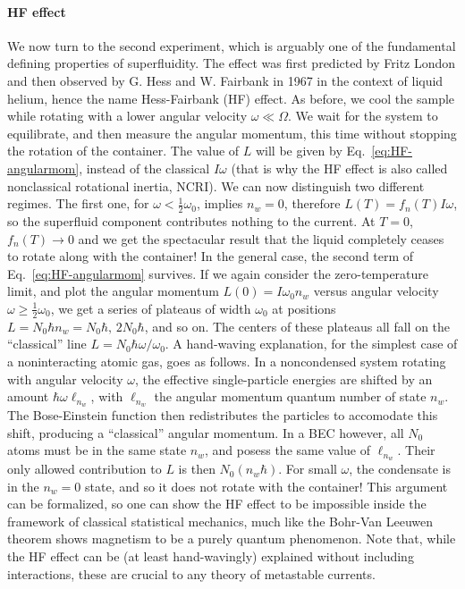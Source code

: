 \paragraph{HF effect}
We now turn to the second experiment, which is arguably one of the
fundamental defining properties of superfluidity. The effect was first
predicted by Fritz London and then observed by G. Hess and W. Fairbank
in 1967 in the context of liquid helium, hence the name Hess-Fairbank
(HF) effect.
%
%
As before, we cool the sample while rotating with a lower angular
velocity $\omega \ll \Omega$. We wait for the system to equilibrate,
and then measure the angular momentum, this time without stopping the
rotation of the container.
%
%
The value of $L$ will be given by Eq.~\eqref{eq:HF-angularmom},
instead of the classical $I \omega$ (that is why the HF effect is also
called nonclassical rotational inertia, NCRI).
%
We can now distinguish two different regimes. The first one, for
$\omega < \frac{1}{2}\omega_0$, implies $n_w = 0$, therefore
$L(T) = f_n(T)I\omega$, so the superfluid component contributes
nothing to the current. At $T=0$, $f_n(T) \rightarrow 0$ and we get
the spectacular result that the liquid completely ceases to rotate
along with the container!
%
In the general case, the second term of Eq.~\eqref{eq:HF-angularmom}
survives. If we again consider the zero-temperature limit, and plot
the angular momentum $L(0) = I\omega_0 n_w$ versus angular velocity
$\omega \geq \frac{1}{2}\omega_0$, we get a series of plateaus of
width $\omega_0$ at positions
$L = N_0 \hbar n_w = N_0 \hbar,\, 2N_0 \hbar$, and so on. The centers
of these plateaus all fall on the ``classical'' line
$L = N_0\hbar \omega/\omega_0$.
%
%
A hand-waving explanation, for the simplest case of a noninteracting
atomic gas, goes as follows. In a noncondensed system rotating with
angular velocity $\omega$, the effective single-particle energies are
shifted by an amount $\hbar\omega \ell_{n_w}$, with $\ell_{n_w}$ the
angular momentum quantum number of state $n_w$. The Bose-Einstein
function then redistributes the particles to accomodate this shift,
producing a ``classical'' angular momentum. In a BEC however, all
$N_0$ atoms must be in the same state $n_w$, and posess the same value
of $\ell_{n_w}$. Their only allowed contribution to $L$ is then
$N_0(n_w\hbar)$. For small $\omega$, the condensate is in the
$n_w = 0$ state, and so it does not rotate with the container! This
argument can be formalized, so one can show the HF effect to be
impossible inside the framework of classical statistical mechanics,
much like the Bohr-Van Leeuwen theorem shows magnetism to be a purely
quantum phenomenon. Note that, while the HF effect can be (at least
hand-wavingly) explained without including interactions, these are
crucial to any theory of metastable currents.


